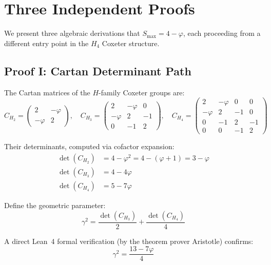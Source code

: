 \documentclass[12pt,a4paper]{article}
\newcommand{\vp}{\varphi}
\newcommand{\Smax}{S_{\max}}
\newcommand{\detC}[1]{\det(C_{#1})}
\begin{document}
\section{Three Independent Proofs}
\label{sec:proofs}

We present three algebraic derivations that $\Smax = 4 - \vp$, each 
proceeding from a different entry point in the $H_4$ Coxeter structure.

\subsection{Proof I: Cartan Determinant Path}
\label{sec:proof_cartan}

The Cartan matrices of the $H$-family Coxeter groups are:
\begin{equation}
C_{H_2} = \begin{pmatrix} 2 & -\vp \\ -\vp & 2 \end{pmatrix}, \quad
C_{H_3} = \begin{pmatrix} 2 & -\vp & 0 \\ -\vp & 2 & -1 \\ 0 & -1 & 2 \end{pmatrix}, \quad
C_{H_4} = \begin{pmatrix} 2 & -\vp & 0 & 0 \\ -\vp & 2 & -1 & 0 \\ 0 & -1 & 2 & -1 \\ 0 & 0 & -1 & 2 \end{pmatrix}
\end{equation}

Their determinants, computed via cofactor expansion:
\begin{align}
\detC{H_2} &= 4 - \vp^2 = 4 - (\vp + 1) = 3 - \vp \label{eq:detC2}\\
\detC{H_3} &= 4 - 4\vp \label{eq:detC3}\\
\detC{H_4} &= 5 - 7\vp \label{eq:detC4}
\end{align}

Define the geometric parameter:
\begin{equation}
\gamma^2 = \frac{\detC{H_3}}{2} + \frac{\detC{H_4}}{4}
\end{equation}

A direct Lean~4 formal verification (by the theorem prover Aristotle) confirms:
\begin{equation}
\label{eq:gamma_sq}
\gamma^2 = \frac{13 - 7\vp}{4}
\end{equation}
\end{document}
